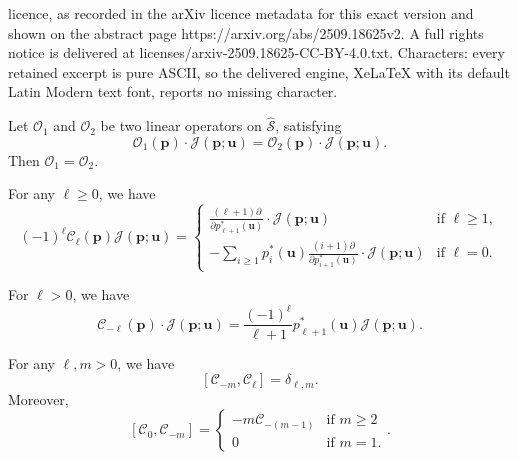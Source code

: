 \documentclass[10pt,a4paper]{amsart}
\newcommand{\C}{\mathcal C}
\newcommand{\bfp}{\boldsymbol{p}}
\newcommand{\bfu}{\boldsymbol{u}}
\newcommand{\mcJ}{\mathcal{J}}
\newcommand{\mcO}{\mathcal{O}}
\newcommand{\mcSh}{\widehat{\mathcal{S}}}
\begin{document}
licence, as recorded in the arXiv licence metadata for this exact version and shown on the abstract page https://arxiv.org/abs/2509.18625v2. A full rights notice is delivered at licenses/arxiv-2509.18625-CC-BY-4.0.txt. Characters: every retained excerpt is pure ASCII, so the delivered engine, XeLaTeX with its default Latin Modern text font, reports no missing character.
\begin{lem}\label{lem:action_Ju}
    Let $\mcO_1$ and $\mcO_2$ be two linear operators on $\mcSh$, satisfying 
    $$\mcO_1(\bfp)\cdot \mcJ(\bfp;\bfu)=\mcO_2(\bfp)\cdot \mcJ(\bfp;\bfu).$$
    Then $\mcO_1=\mcO_2$.
\end{lem}

\begin{cor}\label{cor:Top}
    For any $\ell\geq 0$, we have
    $$(-1)^\ell\C_\ell(\bfp)\mathcal{J}(\bfp;\bfu)=\begin{cases}
        \frac{(\ell+1)\partial}{\partial p^*_{\ell+1}(\bfu)}\cdot \mcJ(\bfp;\bfu)&\text{if }\ell\geq 1,\\
        -\sum_{i\geq 1}p_i^*(\bfu)\frac{(i+1)\partial}{\partial p^*_{i+1}(\bfu)}\cdot \mcJ(\bfp;\bfu)&\text{if $\ell=0$}.
    \end{cases}$$
\end{cor}

\begin{prop}\label{prop:C_negative_mcJ}
    For $\ell>0$, we have 
    $$\C_{-\ell}(\bfp)\cdot \mcJ(\bfp;\bfu)=\frac{(-1)^\ell }{\ell+1}p^*_{\ell+1}(\bfu)\mcJ(\bfp;\bfu).$$
\end{prop}

\begin{thm}\label{thm:commutation_relations_pos_neg}
    For any $\ell,m>0$, we have
\begin{equation}\label{eq:commutation_relations}
      [\C_{-m},\C_\ell]=\delta_{\ell,m}.  
    \end{equation}
Moreover, 
\begin{equation}\label{eq:commutation_relations2}
    [\C_0,\C_{-m}]=
    \begin{cases}
        -m\C_{-(m-1)}&\text{if }m\geq 2\\
        0&\text{if }m=1.
    \end{cases}.
\end{equation}
\end{thm}
\end{document}
